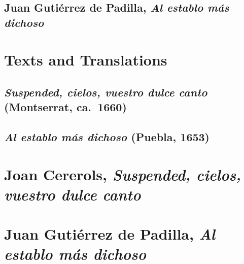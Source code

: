 \documentclass[12pt,oneside]{book}
\begin{document}
\section{Juan Gutiérrez de Padilla, \emph{Al establo más dichoso}}
\lipsum

\chapter{Texts and Translations}

\section{\emph{Suspended, cielos, vuestro dulce canto} (Montserrat, ca.~1660)}
\lipsum

\section{\emph{Al establo más dichoso} (Puebla, 1653)}
\lipsum


\chapter{Joan Cererols, \emph{Suspended, cielos, vuestro dulce canto}}
\lipsum

\chapter{Juan Gutiérrez de Padilla, \emph{Al establo más dichoso}}
\lipsum
\end{document}
